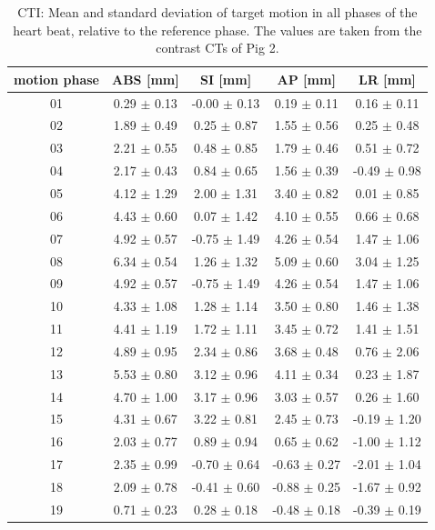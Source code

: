 \documentclass[type=dr, dr=rernat, accentcolor=tud7b,colorbacktitle, bigchapter, openright, twoside, 12pt ]{tudthesis}
\begin{document}
\begin{table}[htbp]
  \centering
    \tiny
  \caption{CTI: Mean and standard deviation of target motion in all phases of the heart beat, relative to the reference phase. The values are 
  taken from the contrast CTs of Pig 2.}
  \begin{tabular}{|c|c|c|c|c|}
    \hline\hline
    motion phase\rule{0pt}{2.6ex}\rule[-1.2ex]{0pt}{0pt} & ABS [mm] & SI [mm] & AP [mm] & LR [mm]\\
    \hline
01 &0.29 $\pm$ 0.13 &-0.00 $\pm$ 0.13 &0.19 $\pm$ 0.11 &0.16 $\pm$ 0.11 \\
02 &1.89 $\pm$ 0.49 &0.25 $\pm$ 0.87 &1.55 $\pm$ 0.56 &0.25 $\pm$ 0.48 \\
03 &2.21 $\pm$ 0.55 &0.48 $\pm$ 0.85 &1.79 $\pm$ 0.46 &0.51 $\pm$ 0.72 \\
04 &2.17 $\pm$ 0.43 &0.84 $\pm$ 0.65 &1.56 $\pm$ 0.39 &-0.49 $\pm$ 0.98 \\
05 &4.12 $\pm$ 1.29 &2.00 $\pm$ 1.31 &3.40 $\pm$ 0.82 &0.01 $\pm$ 0.85 \\
06 &4.43 $\pm$ 0.60 &0.07 $\pm$ 1.42 &4.10 $\pm$ 0.55 &0.66 $\pm$ 0.68 \\
07 &4.92 $\pm$ 0.57 &-0.75 $\pm$ 1.49 &4.26 $\pm$ 0.54 &1.47 $\pm$ 1.06 \\
08 &6.34 $\pm$ 0.54 &1.26 $\pm$ 1.32 &5.09 $\pm$ 0.60 &3.04 $\pm$ 1.25 \\
09 &4.92 $\pm$ 0.57 &-0.75 $\pm$ 1.49 &4.26 $\pm$ 0.54 &1.47 $\pm$ 1.06 \\
10 &4.33 $\pm$ 1.08 &1.28 $\pm$ 1.14 &3.50 $\pm$ 0.80 &1.46 $\pm$ 1.38 \\
11 &4.41 $\pm$ 1.19 &1.72 $\pm$ 1.11 &3.45 $\pm$ 0.72 &1.41 $\pm$ 1.51 \\
12 &4.89 $\pm$ 0.95 &2.34 $\pm$ 0.86 &3.68 $\pm$ 0.48 &0.76 $\pm$ 2.06 \\
13 &5.53 $\pm$ 0.80 &3.12 $\pm$ 0.96 &4.11 $\pm$ 0.34 &0.23 $\pm$ 1.87 \\
14 &4.70 $\pm$ 1.00 &3.17 $\pm$ 0.96 &3.03 $\pm$ 0.57 &0.26 $\pm$ 1.60 \\
15 &4.31 $\pm$ 0.67 &3.22 $\pm$ 0.81 &2.45 $\pm$ 0.73 &-0.19 $\pm$ 1.20 \\
16 &2.03 $\pm$ 0.77 &0.89 $\pm$ 0.94 &0.65 $\pm$ 0.62 &-1.00 $\pm$ 1.12 \\
17 &2.35 $\pm$ 0.99 &-0.70 $\pm$ 0.64 &-0.63 $\pm$ 0.27 &-2.01 $\pm$ 1.04 \\
18 &2.09 $\pm$ 0.78 &-0.41 $\pm$ 0.60 &-0.88 $\pm$ 0.25 &-1.67 $\pm$ 0.92 \\
19 &0.71 $\pm$ 0.23 &0.28 $\pm$ 0.18 &-0.48 $\pm$ 0.18 &-0.39 $\pm$ 0.19 \\
    \hline\hline
  \end{tabular}
  \label{tab:motion:CTI:Pig2}
\end{table}
\end{document}
